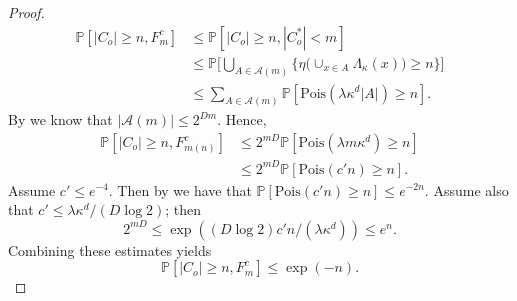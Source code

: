 \documentclass[a4paper,12pt]{scrartcl}
\renewcommand{\P}{\mathbb{P}}
\theoremstyle{definition}
\theoremstyle{remark}
\begin{document}
\begin{proof}
    \begin{align*}
      \P[|C_o|\geq n, F_{m}^c]
      & \leq
      \P[|C_o| \geq n, |C_o^*| < m]
      \\
      & \leq
      \P\bigg[
        \bigcup_{A\in\mathcal A(m)}
        \{ \eta\big(\cup_{x\in A} \Lambda_\kappa(x)\big)\geq n
        \}
      \bigg]  \\
      & \leq
      \sum_{A\in\mathcal A(m)}
      \P[\text{Pois}(\lambda \kappa^d|A|)\geq n].
    \end{align*}
    By \cite[Lemma 9.3]{penrose2003random} we know that $|\mathcal A(m)|\leq 2^{Dm}$. Hence,
    \begin{align*}
      \P[|C_o|\geq n, F_{m(n)}^c]
      & \leq
      2^{mD}
      \P[\text{Pois}(\lambda m \kappa^d)\geq n] \\
      & \leq
      2^{mD}
      \P[\text{Pois}(c'n)\geq n].
    \end{align*}
    Assume $c' \leq e^{-4}$. Then
    by
    \cite[Lemma 1.2, eq. (1.12)]{penrose2003random}
    we have that $ \P[\text{Pois}(c'n)\geq n] \leq e^{-2n}$.
    Assume also that $c' \leq \lambda \kappa^d/(D \log 2)$; then
    $$
    2^{mD} \leq \exp( (D \log 2) c'n /(\lambda \kappa^d) ) \leq e^{n}.
    $$
    Combining these estimates yields
    \begin{equation}\label{eq:exp_bound_eq1}
      \P[|C_o|\geq n, F_m^c]
      \leq
      \exp(-n).
    \end{equation}


\end{proof}
\end{document}
